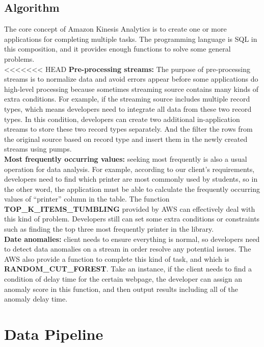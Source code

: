 	\subsection{Algorithm}
    The core concept of Amazon Kinesis Analytics is to create one or more applications for completing multiple tasks. The programming language is SQL in this composition, and it provides enough functions to solve some general problems.\\

<<<<<<< HEAD
	\noindent \textbf{Pre-processing streams:} The purpose of pre-processing streams is to normalize data and avoid errors appear before some applications do high-level processing because sometimes streaming source contains many kinds of extra conditions. For example, if the streaming source includes multiple record types, which means developers need to integrate all data from these two record types. In this condition, developers can create two additional in-application streams to store these two record types separately. And the filter the rows from the original source based on record type and insert them in the newly created streams using pumps.\cite{z4}\\

	\noindent \textbf{Most frequently occurring values:} seeking most frequently is also a usual operation for data analysis. For example, according to our client’s requirements, developers need to find which printer are most commonly used by students, so in the other word, the application must be able to calculate the frequently occurring values of “printer” column in the table. The function \textbf{TOP\_K\_ITEMS\_TUMBLING} provided by AWS can effectively deal with this kind of problem. Developers still can set some extra conditions or constraints such as finding the top three most frequently printer in the library.\\

	\noindent \textbf{Date anomalies:} client needs to ensure everything is normal, so developers need to detect data anomalies on a stream in order resolve any potential issues. The AWS also provide a function to complete this kind of task, and which is \textbf{RANDOM\_CUT\_FOREST}. Take an instance, if the client needs to find a condition of delay time for the certain webpage, the developer can assign an anomaly score in this function, and then output results including all of the anomaly delay time.
       
\section{Data Pipeline}
